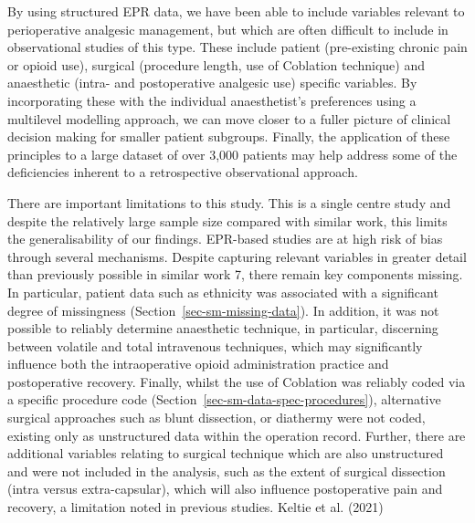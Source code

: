 \documentclass[
  letterpaper,
  DIV=11,
  numbers=noendperiod]{scrreprt}
\begin{document}
By using structured EPR data, we have been able to include variables
relevant to perioperative analgesic management, but which are often
difficult to include in observational studies of this type. These
include patient (pre-existing chronic pain or opioid use), surgical
(procedure length, use of Coblation technique) and anaesthetic (intra-
and postoperative analgesic use) specific variables. By incorporating
these with the individual anaesthetist's preferences using a multilevel
modelling approach, we can move closer to a fuller picture of clinical
decision making for smaller patient subgroups. Finally, the application
of these principles to a large dataset of over 3,000 patients may help
address some of the deficiencies inherent to a retrospective
observational approach.

There are important limitations to this study. This is a single centre
study and despite the relatively large sample size compared with similar
work, this limits the generalisability of our findings. EPR-based
studies are at high risk of bias through several mechanisms. Despite
capturing relevant variables in greater detail than previously possible
in similar work 7, there remain key components missing. In particular,
patient data such as ethnicity was associated with a significant degree
of missingness (Section~\ref{sec-sm-missing-data}). In addition, it was
not possible to reliably determine anaesthetic technique, in particular,
discerning between volatile and total intravenous techniques, which may
significantly influence both the intraoperative opioid administration
practice and postoperative recovery. Finally, whilst the use of
Coblation was reliably coded via a specific procedure code
(Section~\ref{sec-sm-data-spec-procedures}), alternative surgical
approaches such as blunt dissection, or diathermy were not coded,
existing only as unstructured data within the operation record. Further,
there are additional variables relating to surgical technique which are
also unstructured and were not included in the analysis, such as the
extent of surgical dissection (intra versus extra-capsular), which will
also influence postoperative pain and recovery, a limitation noted in
previous studies. Keltie et al. (2021)
\end{document}
